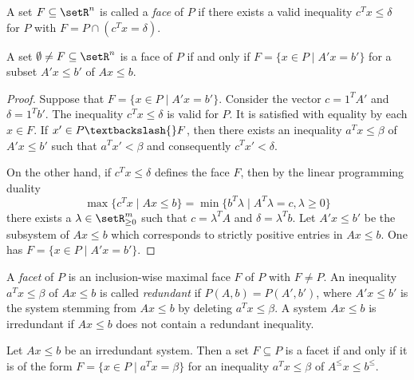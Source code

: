 A set $F\subseteq\setR^n$ is called a \emph{face} of $P$ if there exists a
valid inequality $c^Tx\leq\delta$ for $P$ with $F = P \cap (c^Tx = \delta)$. 


\begin{lemma}
  \label{po:lem:4}
  A set $\emptyset \neq F \subseteq \setR^n$ is a face of $P$
  if and only if $F = \{ x \in P \mid A'x = b'\}$ for a subset $A'x\leq b'$ of $Ax\leq b$.
\end{lemma}

\begin{proof}
  Suppose that $F = \{ x \in P \mid A'x = b'\}$. Consider the vector $c =
  1^TA'$ and $\delta = 1^Tb'$. The inequality $c^Tx\leq \delta$ is valid for
  $P$. It is satisfied with equality by each $x \in F$. If $x' \in P\textbackslash{}
  F$, then there exists an inequality $a^Tx\leq\beta$ of $A'x\leq b'$ such
  that $ a^Tx' < \beta$ and consequently $c^Tx'<\delta$. 

  On the other hand, if $c^Tx\leq\delta$ defines the face $F$,
  then by the linear programming duality
  \[ \max\{ c^Tx \mid Ax\leq b \} = \min\{ b^T\lambda \mid A^T\lambda = c, \lambda \geq 0 \} \]
  there exists a $\lambda \in \setR^m_{\geq 0}$ such that $c=\lambda^TA$ and $\delta = \lambda^Tb$.
  Let $A'x\leq b'$ be the
  subsystem of $Ax\leq b$ which corresponds to strictly positive entries
  in $Ax\leq b$. One has $F = \{ x \in P \mid A'x = b'\}$. 
\end{proof}





A \emph{facet} of $P$ is an inclusion-wise maximal face $F$ of $P$
with $F\neq P$.  An inequality $a^Tx\leq\beta$ of $Ax\leq b$ is called
\emph{redundant} if $P(A,b) = P(A',b')$, where $A'x\leq b'$ is the system
stemming from $Ax\leq b$ by deleting $a^Tx\leq\beta$.  A system $Ax\leq b$ is
irredundant if $Ax\leq b$ does not contain a redundant inequality.

\begin{lemma}
  \label{po:lem:1}
  Let $Ax\leq b$ be an irredundant system. 
  Then a set $F\subseteq P$ is a facet if and only if it is
  of the form $F = \{ x \in P \mid a^Tx = \beta\}$ for an
  inequality $a^Tx\leq\beta$ of $A^\leq x\leq b^\leq$. 
\end{lemma}


